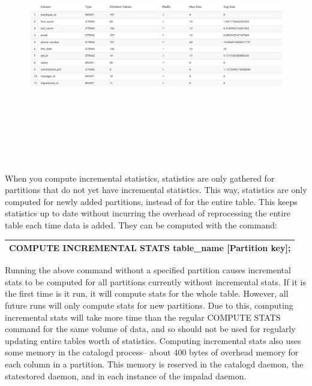 \documentclass[onecolumn, draftclsnofoot,10pt, compsoc]{IEEEtran}
\begin{document}
\begin{figure}[ht]
    \centering
    \includegraphics[width=\linewidth, height=4in, keepaspectratio]{ili0.eps}
\end{figure}

When you compute incremental statistics, statistics are only gathered for partitions that do not yet have incremental statistics. 
This way, statistics are only computed for newly added partitions, instead of for the entire table. 
This keeps statistics up to date without incurring the overhead of reprocessing the entire table each time data is added. 
They can be computed with the command:
\begin{center}
\begin{tabular}{ |c| }
    \hline
    COMPUTE INCREMENTAL STATS table\_name [Partition key]; \\
    \hline
\end{tabular}
\end{center}
Running the above command without a specified partition causes incremental stats to be computed for all partitions currently without incremental stats.
If it is the first time is it run, it will compute stats for the whole table. 
However, all future runs will only compute stats for new partitions. 
Due to this, computing incremental stats will take more time than the regular COMPUTE STATS command for the same volume of data, and so should not be used for regularly updating entire tables worth of statistics. 
Computing incremental stats also uses some memory in the catalogd process-- about 400 bytes of overhead memory for each column in a partition.
This memory is reserved in the catalogd daemon, the statestored daemon, and in each instance of the impalad daemon.
\end{document}
